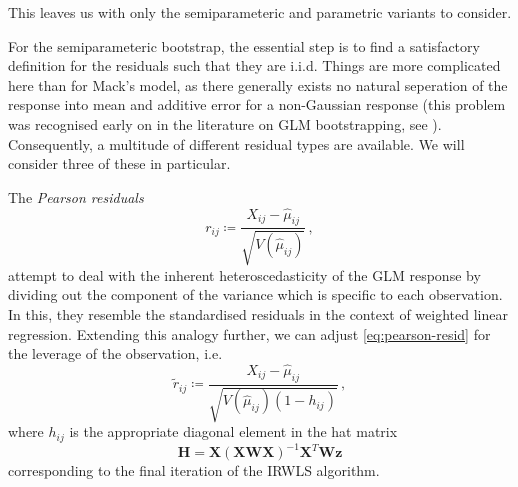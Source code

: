 \documentclass[a4paper]{book}
\begin{document}
This leaves us with only the semiparameteric and parametric variants to consider.


For the semiparameteric bootstrap, the essential step is to find a satisfactory definition for the residuals such that they are i.i.d. Things are more complicated here than for Mack's model, as there generally exists no natural seperation of the response into mean and additive error for a non-Gaussian response (this problem was recognised early on in the literature on GLM bootstrapping, see \cite{moulton}). Consequently, a multitude of different residual types are available. We will consider three of these in particular.

The \emph{Pearson residuals}
\begin{equation} \label{eq:pearson-resid}
  r_{ij} \coloneqq \frac{X_{ij} - \widehat{\mu}_{ij}}{\sqrt{V(\widehat{\mu}_{ij})}} \,,
\end{equation}
attempt to deal with the inherent heteroscedasticity of the GLM response by dividing out the component of the variance which is specific to each observation. In this, they resemble the standardised residuals in the context of weighted linear regression. Extending this analogy further, we can adjust \cref{eq:pearson-resid} for the leverage of the observation, i.e.
\begin{equation}
  \tilde{r}_{ij} \coloneqq \frac{X_{ij} - \widehat{\mu}_{ij}}{\sqrt{V(\widehat{\mu}_{ij}) (1 - h_{ij})}} \,,
\end{equation}
where $h_{ij}$ is the appropriate diagonal element in the hat matrix
\begin{equation}
  \mathbf{H} = \mathbf{X} (\mathbf{XWX})^{-1} \mathbf{X}^T \mathbf{W} \mathbf{z}
\end{equation}
corresponding to the final iteration of the IRWLS algorithm.
\end{document}
